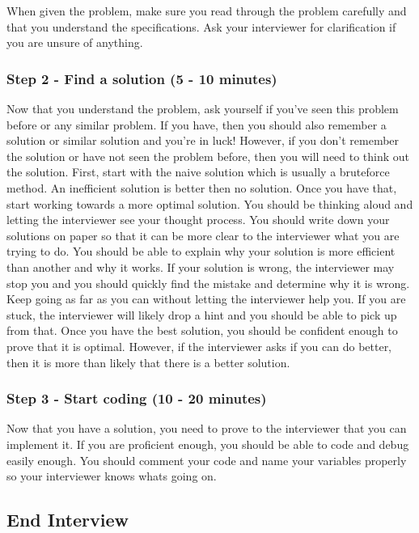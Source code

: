 \documentclass[11pt,oneside]{book}
\begin{document}
When given the problem, make sure you read through the problem carefully and that you understand the specifications. Ask your interviewer for clarification if you are unsure of anything.

\subsubsection{Step 2 - Find a solution (5 - 10 minutes)}

Now that you understand the problem, ask yourself if you've seen this problem before or 
    any similar problem. If you have, then you should also remember a solution or similar solution and you're in luck! 
    However, if you don't remember the solution or have not seen the problem before, then you will
    need to think out the solution. First, start with the naive solution which is usually a bruteforce method. 
    An inefficient solution is better then no solution. Once you have that, start working towards a 
    more optimal solution. You should be thinking aloud and letting the interviewer see your thought process. 
    You should write down your solutions on paper so that it can be more clear to the interviewer what you are trying to do. You should be able
    to explain why your solution is more efficient than another and why it works. If your solution 
    is wrong, the interviewer may stop you and you should quickly find the mistake and determine
    why it is wrong. Keep going as far as you can without letting the interviewer help you. If you are stuck,
    the interviewer will likely drop a hint and you should be able to pick up from that. Once you have the best
    solution, you should be confident enough to prove that it is optimal. However, if the interviewer asks if you can do better,
    then it is more than likely that there is a better solution.

\subsubsection{Step 3 - Start coding (10 - 20 minutes)}

Now that you have a solution, you need to prove to the interviewer that you can implement it. If you are
    proficient enough, you should be able to code and debug easily enough. You should comment your code
    and name your variables properly so your interviewer knows whats going on.

\subsection{End Interview}
\end{document}
